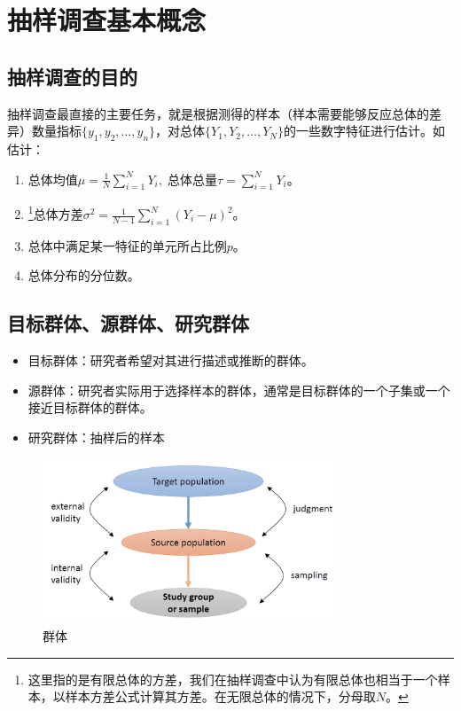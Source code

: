 \chapter{抽样调查基本概念}

\section{抽样调查的目的}
抽样调查最直接的主要任务，就是根据测得的样本（样本需要能够反应总体的差异）数量指标$\{y_1,y_2,\dots,y_n\}$，对总体$\{Y_1,Y_2,\dots,Y_N\}$的一些数字特征进行估计。如估计：
\begin{enumerate}
	\item $\text{总体均值}\mu=\frac{1}{N}\sum_{i=1}^NY_i,\;\text{总体总量}\tau=\sum_{i=1}^NY_i$。
	\item \footnote{这里指的是有限总体的方差，我们在抽样调查中认为有限总体也相当于一个样本，以样本方差公式计算其方差。在无限总体的情况下，分母取$N$。}$\text{总体方差}\sigma^2=\frac{1}{N-1}\sum_{i=1}^N(Y_i-\mu)^2$。
	\item 总体中满足某一特征的单元所占比例$p$。
	\item 总体分布的分位数。
\end{enumerate}

\section{目标群体、源群体、研究群体}
\begin{itemize}
	\item 目标群体：研究者希望对其进行描述或推断的群体。
	\item 源群体：研究者实际用于选择样本的群体，通常是目标群体的一个子集或一个接近目标群体的群体。
	\item 研究群体：抽样后的样本
\end{itemize}
\begin{figure}[htbp] 
	\centering 
	\includegraphics[width=0.8\textwidth]{sampling-method/introduction/population.png}
	\caption{群体} 
\end{figure}

